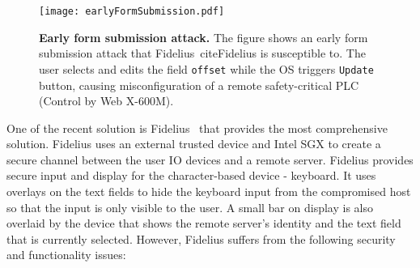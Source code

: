 \begin{figure}[t]
\centering
\texttt{[image: earlyFormSubmission.pdf]} 
\caption{\textbf{Early form submission attack.} The figure shows an early form
submission attack that Fidelius~cite{Fidelius} is susceptible to. The user
selects and edits the field \texttt{offset} while the OS triggers
\texttt{Update} button, causing misconfiguration of a remote safety-critical PLC
(Control by Web X-600M).}
\spacesave
\label{fig:clickJack}
\centering 
\end{figure}


One of the recent solution is Fidelius~\cite{Fidelius} that provides the most comprehensive solution. Fidelius uses an external trusted device and Intel SGX to create a secure channel between the user IO devices and a remote server. Fidelius provides secure input and display for the character-based device - keyboard. It uses overlays on the text fields to hide the keyboard input from the compromised host so that the input is only visible to the user. A small bar on display is also overlaid by the device that shows the remote server's identity and the text field that is currently selected. However, Fidelius suffers from the following security and functionality issues: 
\vspace{-0.5em}
